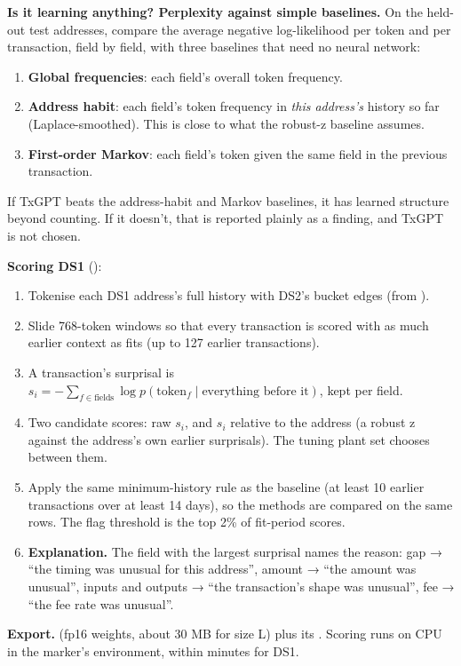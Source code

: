 \textbf{Is it learning anything? Perplexity against simple baselines.} On the held-out test
addresses, compare the average negative log-likelihood per token and per transaction, field by
field, with three baselines that need no neural network:
\begin{enumerate}
  \item \textbf{Global frequencies}: each field's overall token frequency.
  \item \textbf{Address habit}: each field's token frequency in \emph{this address's} history so
    far (Laplace-smoothed). This is close to what the robust-z baseline assumes.
  \item \textbf{First-order Markov}: each field's token given the same field in the previous
    transaction.
\end{enumerate}
If TxGPT beats the address-habit and Markov baselines, it has learned structure beyond counting.
If it doesn't, that is reported plainly as a finding, and TxGPT is not chosen.

\textbf{Scoring DS1} ():
\begin{enumerate}
  \item Tokenise each DS1 address's full history with DS2's bucket edges (from ).
  \item Slide 768-token windows so that every transaction is scored with as much earlier context
    as fits (up to 127 earlier transactions).
  \item A transaction's surprisal is $s_i = -\sum_{f\in\text{fields}} \log p(\text{token}_f \mid
    \text{everything before it})$, kept per field.
  \item Two candidate scores: raw $s_i$, and $s_i$ relative to the address (a robust z against
    the address's own earlier surprisals). The tuning plant set chooses between them.
  \item Apply the same minimum-history rule as the baseline (at least 10 earlier transactions
    over at least 14 days), so the methods are compared on the same rows. The flag threshold is
    the top 2\% of fit-period scores.
  \item \textbf{Explanation.} The field with the largest surprisal names the reason: gap →
    ``the timing was unusual for this address'', amount → ``the amount was unusual'', inputs and
    outputs → ``the transaction's shape was unusual'', fee → ``the fee rate was unusual''.
\end{enumerate}

\textbf{Export.}  (fp16 weights, about 30 MB for size L\est{}) plus its
. Scoring runs on CPU in the marker's environment, within minutes for DS1.

